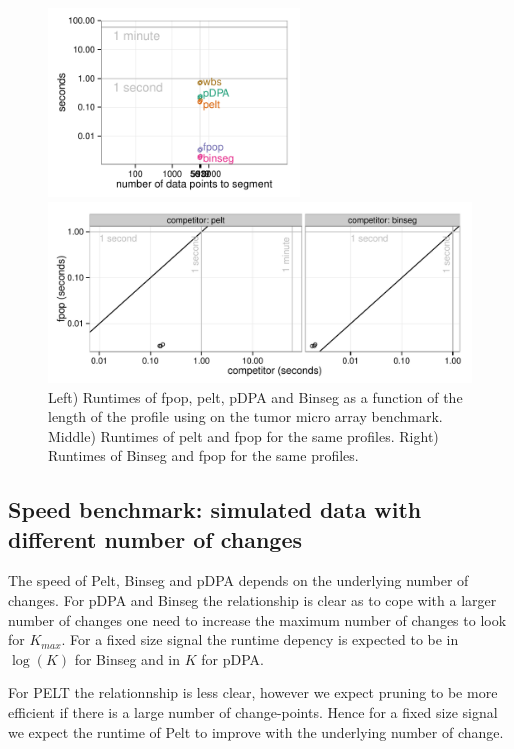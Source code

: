\documentclass{article}
\begin{document}
\begin{figure}\label{fig:sys_runtimes_microarray}
 \parbox{6.5cm}{ \includegraphics[height=5cm]{figure-systemtime-arrays-small}
  } \parbox{12.5cm}{  \includegraphics[width=\linewidth]{figure-systemtime-arrays-fpop-pelt-small}}
 

\caption{Left) Runtimes of fpop, pelt,
pDPA and Binseg as a function of the length of the profile  using  on the tumor micro array benchmark. 
Middle) Runtimes of pelt and fpop for the same profiles.
Right) Runtimes of Binseg and fpop for the same profiles.
}
\end{figure}





\subsection{Speed benchmark: simulated data with different 
  number of changes}

The speed of Pelt, Binseg and pDPA depends on the underlying number of changes.
For pDPA and Binseg the relationship is clear as to cope with a larger number of changes
one need to increase the maximum number of changes to look for $K_{max}$. 
For a fixed size signal the runtime depency is expected to be in $\log(K)$ for Binseg and
in $K$ for pDPA.

For PELT the relationnship is less clear, however we expect pruning to be more efficient
if there is a large number of change-points. Hence for a fixed size signal we expect 
the runtime of Pelt to improve with the underlying number of change.
\end{document}
